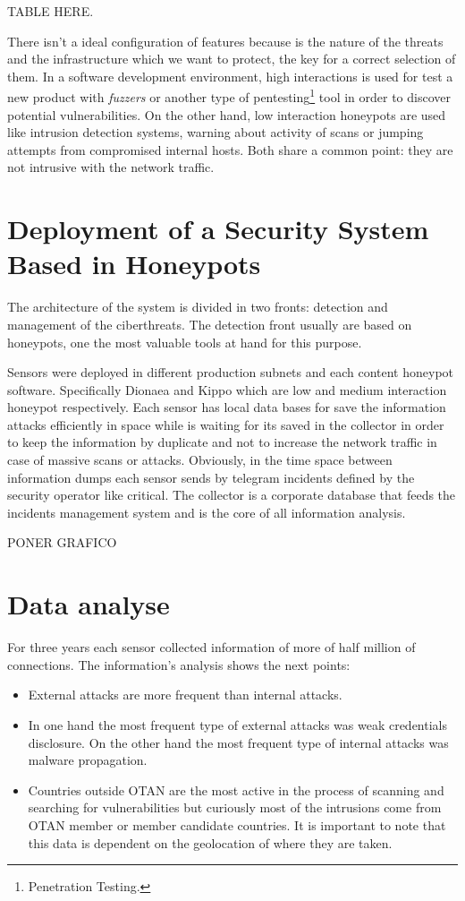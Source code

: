 \documentclass[a4paper]{llncs}
\begin{document}
TABLE HERE.

There isn't a ideal configuration of features because is the nature of the threats and the infrastructure which we want to protect, the key for a correct selection of them. In a software development environment, high interactions is used for test a new product with {\it fuzzers} or another type of pentesting\footnote{Penetration Testing.} tool in order to discover potential vulnerabilities. On the other hand, low interaction honeypots are used like intrusion detection systems, warning about activity of scans or jumping attempts from compromised internal hosts. Both share a common point: they are not intrusive with the network traffic.

\section{Deployment of a Security System Based in Honeypots}
The architecture of the system is divided in two fronts: detection and management of the ciberthreats. The detection front usually are based on honeypots, one the most valuable tools at hand for this purpose.

Sensors were deployed in different production subnets and each content honeypot software. Specifically Dionaea\cite{dionaea} and Kippo\cite{kippo} which are low and medium interaction honeypot respectively. Each sensor has local data bases for save the information attacks efficiently in space while is waiting for its saved in the collector in order to keep the information by duplicate and not to increase the network traffic in case of massive scans or attacks. Obviously, in the time space between information dumps each sensor sends by telegram incidents defined by the security operator like critical. The collector is a corporate database that feeds the incidents management system and is the core of all information analysis.

PONER GRAFICO

\section{Data analyse}
For three years each sensor collected information of more of half million of connections. The information's analysis shows the next points:
\begin{itemize}
\item External attacks are more frequent than internal attacks. %
\item In one hand the most frequent type of external attacks was weak credentials disclosure. On the other hand the most frequent type of internal attacks was malware propagation.
\item Countries outside OTAN are the most active in the process of scanning and searching for vulnerabilities but curiously most of the intrusions come from OTAN member or member candidate countries. It is important to note that this data is dependent on the geolocation of where they are taken.
\end{itemize}
\end{document}
